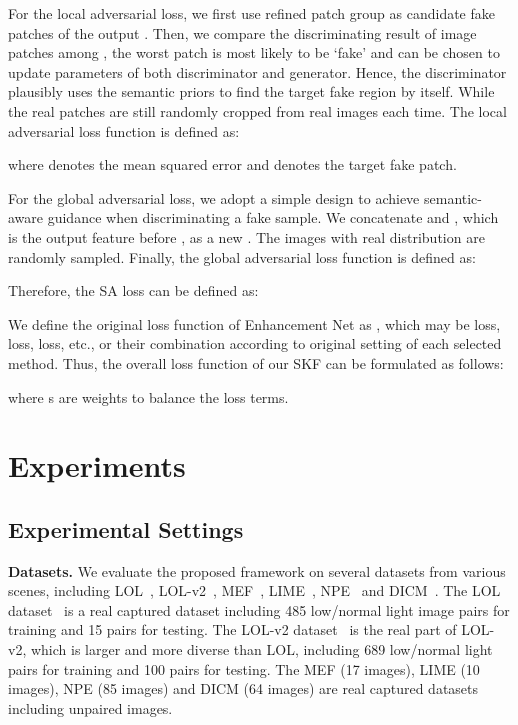 \documentclass[10pt,twocolumn,letterpaper]{article}
\begin{document}
For the local adversarial loss, we first use refined patch group  as candidate fake patches of the output . Then, we compare the discriminating result of image patches among , the worst patch is most likely to be ‘fake’ and can be chosen to update parameters of both discriminator and generator. Hence, the discriminator plausibly uses the semantic priors to find the target fake region  by itself. While the real patches  are still randomly cropped from real images each time. The local adversarial loss function is defined as:
\vspace{-0.1cm}

\vspace{-0.1cm}


where  denotes the mean squared error and  denotes the target fake patch.

For the global adversarial loss, we adopt a simple design to achieve semantic-aware guidance when discriminating a fake sample. We concatenate  and , which is the output feature before , as a new . The images  with real distribution are randomly sampled. Finally, the global adversarial loss function is defined as:
\vspace{-0.1cm}


Therefore, the SA loss can be defined as:
\vspace{-0.1cm}


We define the original loss function of Enhancement Net as , which may be  loss,  loss,  loss, etc., or their combination according to original setting of each selected method. Thus, the overall loss function of our SKF can be formulated as follows:
\vspace{-0.1cm}


where s are weights to balance the loss terms. 

\vspace{-0.15cm}
\section{Experiments}
\vspace{-0.05cm}
\subsection{Experimental Settings}
\vspace{-0.05cm}

\textbf{Datasets.} We evaluate the proposed framework on several datasets from various scenes, including LOL~\cite{Chen2018Retinex}, LOL-v2~\cite{yang2021sparse}, MEF~\cite{ma2015mef}, LIME~\cite{guo2016lime-mm}, NPE~\cite{wang2013npe} and DICM~\cite{lee2013dicm}. The LOL dataset~\cite{Chen2018Retinex} is a real captured dataset including 485 low/normal light image pairs for training and 15 pairs for testing. The LOL-v2 dataset~\cite{yang2021sparse} is the real part of LOL-v2, which is larger and more diverse than LOL, including 689 low/normal light pairs for training and 100 pairs for testing. The MEF (17 images), LIME (10 images), NPE (85 images) and DICM (64 images) are real captured datasets including unpaired images.
\end{document}
